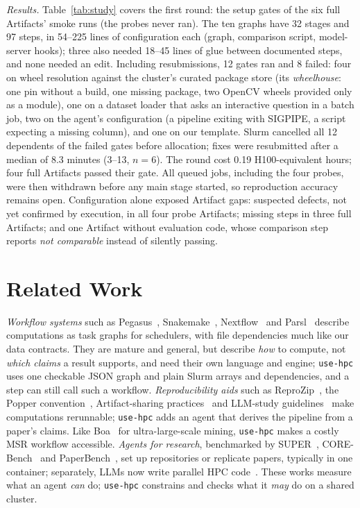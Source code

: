\documentclass[10pt,conference]{IEEEtran}
\newcommand{\tool}{\texttt{use-hpc}}
\begin{document}
\emph{Results.} Table~\ref{tab:study} covers the first round: the setup gates of the six full Artifacts' smoke runs (the probes never ran). The ten graphs have 32 stages and 97 steps, in 54--225 lines of configuration each (graph, comparison script, model-server hooks); three also needed 18--45 lines of glue between documented steps, and none needed an edit. Including resubmissions, 12 gates ran and 8 failed: four on wheel resolution against the cluster's curated package store (its \emph{wheelhouse}: one pin without a build, one missing package, two OpenCV wheels provided only as a module), one on a dataset loader that asks an interactive question in a batch job, two on the agent's configuration (a pipeline exiting with SIGPIPE, a script expecting a missing column), and one on our template. Slurm cancelled all 12 dependents of the failed gates before allocation; fixes were resubmitted after a median of 8.3 minutes (3--13, $n = 6$). The round cost 0.19 H100-equivalent hours; four full Artifacts passed their gate. All queued jobs, including the four probes, were then withdrawn before any main stage started, so reproduction accuracy remains open. Configuration alone exposed Artifact gaps: suspected defects, not yet confirmed by execution, in all four probe Artifacts; missing steps in three full Artifacts; and one Artifact without evaluation code, whose comparison step reports \emph{not comparable} instead of silently passing.

\section{Related Work}\label{sec:related}

\emph{Workflow systems} such as Pegasus~\cite{deelman2015pegasus}, Snakemake~\cite{molder2021snakemake}, Nextflow~\cite{ditommaso2017nextflow} and Parsl~\cite{babuji2019parsl} describe computations as task graphs for schedulers, with file dependencies much like our data contracts. They are mature and general, but describe \emph{how} to compute, not \emph{which claims} a result supports, and need their own language and engine; \tool{} uses one checkable JSON graph and plain Slurm arrays and dependencies, and a step can still call such a workflow. \emph{Reproducibility aids} such as ReproZip~\cite{chirigati2016reprozip}, the Popper convention~\cite{jimenez2017popper}, Artifact-sharing practices~\cite{timperley2021artifact} and LLM-study guidelines~\cite{baltes2025guidelines} make computations rerunnable; \tool{} adds an agent that derives the pipeline from a paper's claims. Like Boa~\cite{dyer2013boa} for ultra-large-scale mining, \tool{} makes a costly MSR workflow accessible. \emph{Agents for research}, benchmarked by SUPER~\cite{bogin2024super}, CORE-Bench~\cite{siegel2024corebench} and PaperBench~\cite{starace2025paperbench}, set up repositories or replicate papers, typically in one container; separately, LLMs now write parallel HPC code~\cite{nichols2024hpccoder}. These works measure what an agent \emph{can} do; \tool{} constrains and checks what it \emph{may} do on a shared cluster.
\end{document}

